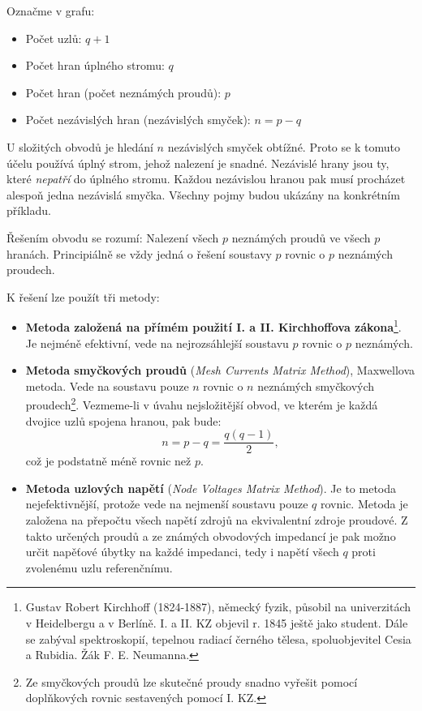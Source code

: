       Označme v grafu:
       \begin{itemize}[noitemsep]
         \item Počet uzlů:  \(q +1\)
      \item Počet hran úplného stromu:  \(q\)
      \item Počet hran (počet neznámých proudů):  \(p\)
      \item Počet nezávislých hran (nezávislých smyček):  \(n=p-q\)
      \end{itemize}
      
      U složitých obvodů je hledání \(n\) nezávislých smyček obtížné. Proto se k tomuto účelu 
      používá úplný strom, jehož nalezení je snadné. Nezávislé hrany jsou ty, které \emph{nepatří} 
      do úplného stromu. Každou nezávislou hranou pak musí procházet alespoň jedna nezávislá 
      smyčka. Všechny pojmy budou ukázány na konkrétním příkladu.
      
      Řešením obvodu se rozumí: Nalezení všech \(p\) neznámých proudů ve všech \(p\) hranách.
      Principiálně se vždy jedná o řešení soustavy \(p\) rovnic o \(p\) neznámých proudech.
      
      K řešení lze použít tři metody:
      \begin{itemize}[noitemsep]
       \item \textbf{Metoda založená na přímém použití I. a II. Kirchhoffova 
             zákona}\footnote{Gustav Robert Kirchhoff (1824-1887), německý fyzik, působil na 
             univerzitách v Heidelbergu a v Berlíně. I. a II. KZ objevil r. 1845 ještě jako 
             student. Dále se zabýval spektroskopií, tepelnou radiací černého tělesa, 
             spoluobjevitel Cesia a Rubidia. Žák F. E. Neumanna.}.
             Je nejméně efektivní, vede na nejrozsáhlejší soustavu \(p\) rovnic o \(p\) neznámých.
       \item \textbf{Metoda smyčkových proudů} (\emph{Mesh Currents Matrix Method}), Maxwellova 
             metoda. Vede na soustavu pouze \(n\) rovnic o \(n\) neznámých smyčkových 
             proudech\footnote{Ze smyčkových proudů lze skutečné proudy snadno vyřešit pomocí 
             doplňkových rovnic sestavených pomocí I. KZ.}. Vezmeme-li v úvahu nejsložitější obvod, 
             ve kterém je každá dvojice uzlů spojena hranou, pak bude:
             \begin{equation}\label{ES:eq_topol00}
               n=p-q=\frac{q(q-1)}{2},
             \end{equation}
             což je  podstatně méně rovnic než \(p\).
       \item \textbf{Metoda uzlových napětí} (\emph{Node Voltages Matrix Method}). Je to metoda 
             nejefektivnější, protože vede na nejmenší soustavu pouze \(q\) rovnic. Metoda je 
             založena na přepočtu všech napětí zdrojů na ekvivalentní zdroje proudové. Z takto 
             určených proudů a ze známých obvodových impedancí je pak možno určit napěťové úbytky 
             na každé impedanci, tedy i napětí všech \(q\) proti zvolenému uzlu referenčnímu.
      \end{itemize}
      
